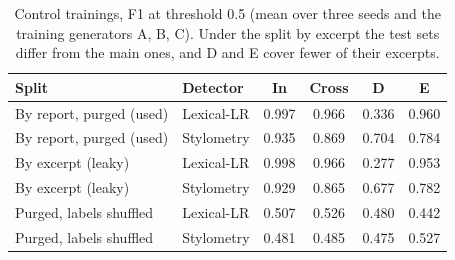 \begin{table}[t]
\centering
\scriptsize\setlength{\tabcolsep}{3pt}
\caption{Control trainings, F1 at threshold 0.5 (mean over three seeds and the training generators A, B, C). Under the split by excerpt the test sets differ from the main ones, and D and E cover fewer of their excerpts.}
\label{tab:controls}
\begin{tabular}{llcccc}
\toprule
Split & Detector & In & Cross & D & E \\
\midrule
By report, purged (used) & Lexical-LR & 0.997 & 0.966 & 0.336 & 0.960 \\
By report, purged (used) & Stylometry & 0.935 & 0.869 & 0.704 & 0.784 \\
By excerpt (leaky) & Lexical-LR & 0.998 & 0.966 & 0.277 & 0.953 \\
By excerpt (leaky) & Stylometry & 0.929 & 0.865 & 0.677 & 0.782 \\
Purged, labels shuffled & Lexical-LR & 0.507 & 0.526 & 0.480 & 0.442 \\
Purged, labels shuffled & Stylometry & 0.481 & 0.485 & 0.475 & 0.527 \\
\bottomrule
\end{tabular}
\end{table}

